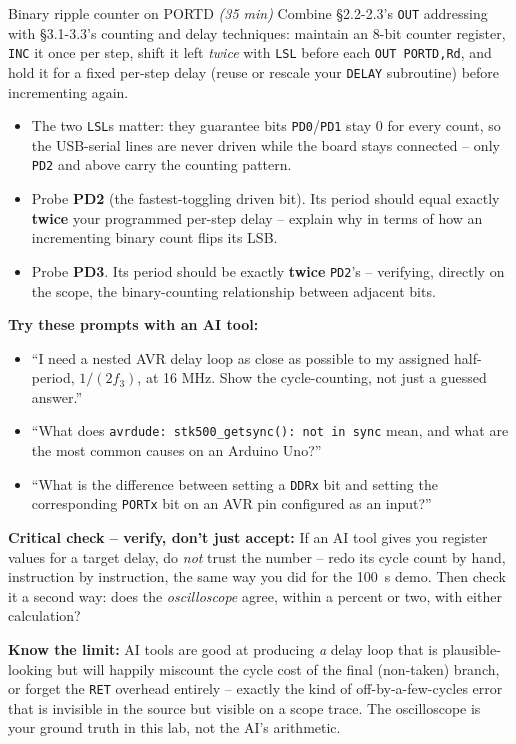 \documentclass[11pt]{article}
\begin{document}
\begin{labexercise}{Binary ripple counter on PORTD \hfill {\small \itshape (35 min)}}
Combine \S2.2-2.3's \texttt{OUT} addressing with \S3.1-3.3's counting and delay
techniques: maintain an 8-bit counter register, \texttt{INC} it once per step, shift
it left \emph{twice} with \texttt{LSL} before each \texttt{OUT PORTD,Rd}, and hold it
for a fixed per-step delay (reuse or rescale your \texttt{DELAY} subroutine) before
incrementing again.
\begin{itemize}[nosep,leftmargin=*]
  \item The two \texttt{LSL}s matter: they guarantee bits \texttt{PD0}/\texttt{PD1}
        stay 0 for every count, so the USB-serial lines are never driven while the
        board stays connected -- only \texttt{PD2} and above carry the counting
        pattern.
  \item Probe \textbf{PD2} (the fastest-toggling driven bit). Its period should equal
        exactly \textbf{twice} your programmed per-step delay -- explain why in terms
        of how an incrementing binary count flips its LSB.
  \item Probe \textbf{PD3}. Its period should be exactly \textbf{twice} \texttt{PD2}'s
        -- verifying, directly on the scope, the binary-counting relationship between
        adjacent bits.
\end{itemize}
\end{labexercise}

\begin{aicollab}
\textbf{Try these prompts with an AI tool:}
\begin{itemize}[leftmargin=*,nosep]
  \item ``I need a nested AVR delay loop as close as possible to my assigned
        half-period, $1/(2f_3)$, at 16 MHz. Show the cycle-counting, not just a
        guessed answer.''
  \item ``What does \texttt{avrdude: stk500\_getsync(): not in sync} mean, and what
        are the most common causes on an Arduino Uno?''
  \item ``What is the difference between setting a \texttt{DDRx} bit and setting the
        corresponding \texttt{PORTx} bit on an AVR pin configured as an input?''
\end{itemize}

\medskip\textbf{Critical check -- verify, don't just accept:}
If an AI tool gives you register values for a target delay, do \emph{not} trust the
number -- redo its cycle count by hand, instruction by instruction, the same way you
did for the 100~\textmu s demo. Then check it a second way: does the
\emph{oscilloscope} agree, within a percent or two, with either calculation?

\medskip\textbf{Know the limit:}
AI tools are good at producing \emph{a} delay loop that is plausible-looking but will
happily miscount the cycle cost of the final (non-taken) branch, or forget the
\texttt{RET} overhead entirely -- exactly the kind of off-by-a-few-cycles error that
is invisible in the source but visible on a scope trace. The oscilloscope is your
ground truth in this lab, not the AI's arithmetic.
\end{aicollab}
\end{document}
